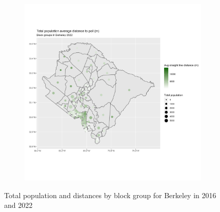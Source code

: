 \documentclass[11pt]{article}
\theoremstyle{remark}
\theoremstyle{definition}
\begin{document}
\begin{figure}
\begin{subfigure}{.5\textwidth}
		\includegraphics[width=\linewidth]{result_analysis/Berkeley_County_SC_original_configs/population_pop_and_dist_Berkeley_config_original_2022_polls.png}
		\label{sfig:Berkeley_2022_bg_dist}
	\end{subfigure}
	\caption{Total population and distances by block group for Berkeley in 2016 and 2022}
	\label{fig:Berkeley distance Total population maps}
\end{figure}
\end{document}
